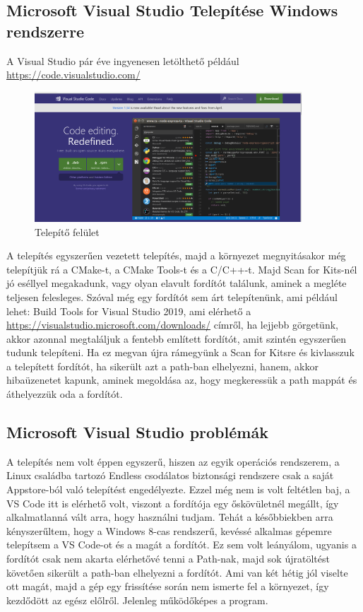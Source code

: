 \documentclass{article}
\begin{document}
\subsection{Microsoft Visual Studio Telepítése Windows rendszerre}
A Visual Studio pár éve ingyenesen letölthető például \url{https://code.visualstudio.com/}
\begin{figure}[h!]
\includegraphics[width=10cm]{screeen.png}
\caption{Telepítő felület}
\end{figure}
A telepítés egyszerűen vezetett telepítés, majd a környezet megnyitásakor még telepítjük rá a CMake-t, a CMake Tools-t és a C/C++-t. Majd Scan for Kits-nél jó eséllyel megakadunk, vagy olyan elavult fordítót találunk, aminek a megléte teljesen felesleges. Szóval még egy fordítót sem árt telepítenünk, ami például lehet: Build Tools for Visual Studio 2019, ami elérhető a \url{https://visualstudio.microsoft.com/downloads/} címről, ha lejjebb görgetünk, akkor azonnal megtaláljuk a fentebb említett fordítót, amit szintén egyszerűen tudunk telepíteni. Ha ez megvan újra rámegyünk a Scan for Kitsre és kivlasszuk a telepített fordítót, ha sikerült azt a path-ban elhelyezni, hanem, akkor hibaüzenetet kapunk, aminek megoldása az, hogy megkeressük a path mappát és áthelyezzük oda a fordítót. 

\subsection{Microsoft Visual Studio problémák}
A telepítés nem volt éppen egyszerű, hiszen az egyik operációs rendszerem, a Linux családba tartozó Endless csodálatos biztonsági rendszere csak a saját Appstore-ból való telepítést engedélyezte. Ezzel még nem is volt feltétlen baj, a VS Code itt is elérhető volt, viszont a fordítója egy őskövületnél megállt, így alkalmatlanná vált arra, hogy használni tudjam. Tehát a későbbiekben arra kényszerűltem, hogy a Windows 8-cas rendszerű, kevéssé alkalmas gépemre telepítsem a VS Code-ot és a magát a fordítót. Ez sem volt leányálom, ugyanis a fordítót csak nem akarta elérhetővé tenni a Path-nak, majd sok újratöltést követően sikerült a path-ban elhelyezni a fordítót. Ami van két hétig jól viselte ott magát, majd a gép egy frissítése során nem ismerte fel a környezet, így kezdődött az egész előlről. Jelenleg működőképes a program.
\end{document}
